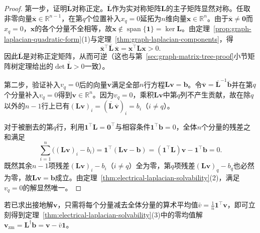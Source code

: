 \begin{proof}
第一步，证明$\overline{\bm L}$对称正定。$\overline{\bm L}$作为实对称矩阵$\bm L$的主子矩阵显然对称。任取非零向量$\overline{\bm x}\in\mathbb R^{n-1}$，在第$q$个位置补入$x_q=0$延拓为$n$维向量$\bm x\in\mathbb R^n$。由于$\overline{\bm x}\neq\bm 0$而$x_q=0$，$\bm x$的各个分量不全相等，故$\bm x\notin\operatorname{span}\{\bm 1\}=\ker\bm L$。由定理~\ref{prop:graph-laplacian-quadratic-form}(1)与定理~\ref{thm:graph-laplacian-components}，得
\[
  \overline{\bm x}^\top \overline{\bm L}\,\overline{\bm x}
  = \bm x^\top \bm L \bm x > 0.
\]
因此$\overline{\bm L}$是对称正定矩阵，从而可逆（这也与第~\ref{sec:graph-matrix-tree-proof}小节矩阵树定理给出的$\det\overline{\bm L}>0$一致）。

第二步，验证补入$v_q=0$后的向量$\bm v$满足全部$n$行方程$\bm L\bm v=\bm b$。令$\overline{\bm v}=\overline{\bm L}^{-1}\overline{\bm b}$并在第$q$个分量补入$v_q=0$得到$\bm v\in\mathbb R^n$。因为$v_q=0$，乘积$\bm L\bm v$中第$q$列不产生贡献，故在除$q$以外的$n-1$行上已有$(\bm L\bm v)_i=(\overline{\bm L}\,\overline{\bm v})_i=b_i$（$i\neq q$）。

对于被删去的第$q$行，利用$\bm 1^\top\bm L=\bm 0^\top$与相容条件$\bm 1^\top\bm b=0$，全体$n$个分量的残差之和满足
\[
  \sum_{i=1}^n\bigl((\bm L\bm v)_i - b_i\bigr)
  = \bm 1^\top(\bm L\bm v - \bm b)
  = (\bm 1^\top\bm L)\bm v - \bm 1^\top\bm b = 0.
\]
既然其余$n-1$项残差$(\bm L\bm v)_i-b_i$（$i\neq q$）全为零，第$q$项残差$(\bm L\bm v)_q-b_q$也必然为零，故$\bm L\bm v=\bm b$成立。由定理~\ref{thm:electrical-laplacian-solvability}(2)，满足$v_q=0$的解显然唯一。
\end{proof}

若已求出接地解$\bm v$，只需将每个分量减去全体分量的算术平均值$\bar v = \frac1n\bm 1^\top\bm v$，即可立刻得到定理~\ref{thm:electrical-laplacian-solvability}(3)中的零均值解$\bm v_{\mathrm{zm}}=\bm L^\dagger\bm b = \bm v - \bar v\bm 1$。

